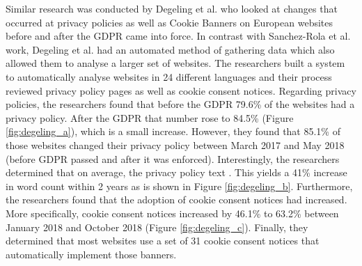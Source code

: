 \documentclass[../main.tex]{subfiles}
\begin{document}
Similar research was conducted by Degeling et al. \cite{degeling2018we} who looked at changes that occurred at privacy policies as well as Cookie Banners on European websites before and after the GDPR came into force. In contrast with Sanchez-Rola et al. work, Degeling et al. had an automated method of gathering data which also allowed them to analyse a larger set of websites. The researchers built a system to automatically analyse websites in 24 different languages and their process reviewed privacy policy pages as well as cookie consent notices. Regarding privacy policies, the researchers found that before the GDPR 79.6\% of the websites had a privacy policy. After the GDPR that number rose to 84.5\% (Figure \ref{fig:degeling_a}), which is a small increase. However, they found that 85.1\% of those websites changed their privacy policy between March 2017 and May 2018 (before GDPR passed and after it was enforced). Interestingly, the researchers determined that on average, the privacy policy text . This yields a 41\% increase in word count within 2 years as is shown in Figure \ref{fig:degeling_b}. Furthermore, the researchers found that the adoption of cookie consent notices had increased. More specifically, cookie consent notices increased by 46.1\% to 63.2\% between January 2018 and October 2018 (Figure \ref{fig:degeling_c}). Finally, they determined that most websites use a set of 31 cookie consent notices that automatically implement those banners. 
\end{document}
